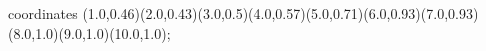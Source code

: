 					coordinates { (1.0,0.46)(2.0,0.43)(3.0,0.5)(4.0,0.57)(5.0,0.71)(6.0,0.93)(7.0,0.93)(8.0,1.0)(9.0,1.0)(10.0,1.0)};